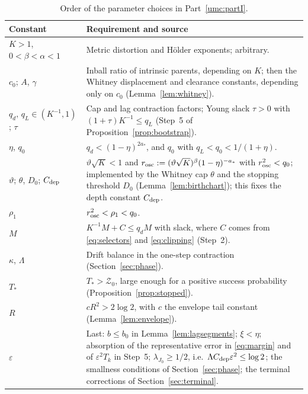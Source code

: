 \documentclass[11pt]{article}
\theoremstyle{definition}
\theoremstyle{remark}
\numberwithin{equation}{section}
\begin{document}
\begin{table}[ht]
\centering
\small
\renewcommand{\arraystretch}{1.15}
\begin{tabular}{@{}p{}p{}@{}}
\toprule
Constant & Requirement and source\\
\midrule
$K>1$, $0<\beta<\alpha<1$
 & Metric distortion and H\"older exponents; arbitrary.\\
$c_0$; $A$, $\gamma$
 & Inball ratio of intrinsic parents, depending on $K$; then the
   Whitney displacement and clearance constants, depending only on
   $c_0$ (Lemma~\ref{lem:whitney}).\\
$q_d,\,q_L\in(K^{-1},1)$; $\tau$
 & Cap and lag contraction factors; Young slack $\tau>0$ with
   $(1+\tau)K^{-1}\le q_L$ (Step~5 of
   Proposition~\ref{prop:bootstrap}).\\
$\eta$, $q_0$
 & $q_d<(1-\eta)^{2a_*}$, and $q_0$ with $q_L<q_0<1/(1+\eta)$.\\
$\vartheta$; $\theta$, $D_0$; $C_{\rm dep}$
 & $\vartheta\sqrt K<1$ and
   $r_{\rm osc}:=(\vartheta\sqrt K)^\beta(1-\eta)^{-a_*}$ with
   $r_{\rm osc}^2<q_0$; implemented by the Whitney cap $\theta$ and
   the stopping threshold $D_0$ (Lemma~\ref{lem:birthchart}); this
   fixes the depth constant $C_{\rm dep}$.\\
$\rho_1$
 & $r_{\rm osc}^2<\rho_1<q_0$.\\
$M$
 & $K^{-1}M+C\le q_dM$ with slack, where $C$ comes from
   \eqref{eq:selectors} and \eqref{eq:clipping} (Step~2).\\
$\kappa$, $\Lambda$
 & Drift balance in the one-step contraction
   (Section~\ref{sec:phase}).\\
$T_*$
 & $T_*>\mathcal Z_0$, large enough for a positive success
   probability (Proposition~\ref{prop:stopped}).\\
$R$
 & $cR^2>2\log2$, with $c$ the envelope tail constant
   (Lemma~\ref{lem:envelope}).\\
$\varepsilon$
 & Last: $b\le b_0$ in Lemma~\ref{lem:lagsegments}; $\xi<\eta$;
   absorption of the representative error in \eqref{eq:margin} and of
   $\varepsilon^2T_k$ in Step~5; $\lambda_{J_0}\ge1/2$, i.e.\
   $\Lambda C_{\rm dep}\varepsilon^2\le\log2$; the smallness conditions
   of Section~\ref{sec:phase}; the terminal corrections of
   Section~\ref{sec:terminal}.\\
\bottomrule
\end{tabular}
\caption{Order of the parameter choices in Part~\ref{umc:partI}.}
\label{tab:parameters}
\end{table}
\end{document}
